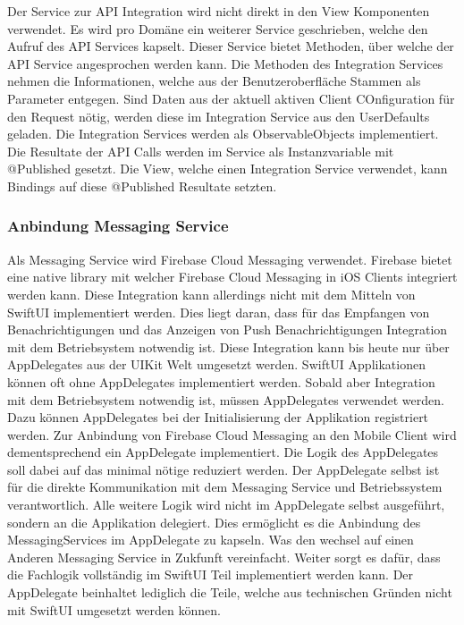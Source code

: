 Der Service zur API Integration wird nicht direkt in den View Komponenten verwendet.
Es wird pro Domäne ein weiterer Service geschrieben, welche den Aufruf des API Services kapselt.
Dieser Service bietet Methoden, über welche der API Service angesprochen werden kann.
Die Methoden des Integration Services nehmen die Informationen, welche aus der Benutzeroberfläche Stammen als Parameter entgegen.
Sind Daten aus der aktuell aktiven Client COnfiguration für den Request nötig, werden diese im Integration Service aus den UserDefaults geladen.
Die Integration Services werden als ObservableObjects implementiert.
Die Resultate der API Calls werden im Service als Instanzvariable mit @Published gesetzt.
Die View, welche einen Integration Service verwendet, kann Bindings auf diese @Published Resultate setzten.

\subsubsection{Anbindung Messaging Service}

Als Messaging Service wird Firebase Cloud Messaging verwendet.
Firebase bietet eine native library mit welcher Firebase Cloud Messaging in iOS Clients integriert werden kann.
Diese Integration kann allerdings nicht mit dem Mitteln von SwiftUI implementiert werden.
Dies liegt daran, dass für das Empfangen von Benachrichtigungen und das Anzeigen von Push Benachrichtigungen Integration mit dem Betriebsystem notwendig ist.
Diese Integration kann bis heute nur über AppDelegates aus der UIKit Welt umgesetzt werden.
SwiftUI Applikationen können oft ohne AppDelegates implementiert werden.
Sobald aber Integration mit dem Betriebsystem notwendig ist, müssen AppDelegates verwendet werden.
Dazu können AppDelegates bei der Initialisierung der Applikation registriert werden.
Zur Anbindung von Firebase Cloud Messaging an den Mobile Client wird dementsprechend ein AppDelegate implementiert.
Die Logik des AppDelegates soll dabei auf das minimal nötige reduziert werden.
Der AppDelegate selbst ist für die direkte Kommunikation mit dem Messaging Service und Betriebssystem verantwortlich.
Alle weitere Logik wird nicht im AppDelegate selbst ausgeführt, sondern an die Applikation delegiert.
Dies ermöglicht es die Anbindung des MessagingServices im AppDelegate zu kapseln.
Was den wechsel auf einen Anderen Messaging Service in Zukfunft vereinfacht.
Weiter sorgt es dafür, dass die Fachlogik vollständig im SwiftUI Teil implementiert werden kann.
Der AppDelegate beinhaltet lediglich die Teile, welche aus technischen Gründen nicht mit SwiftUI umgesetzt werden können.


